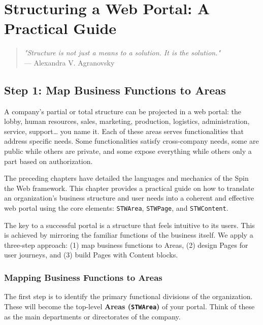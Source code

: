 \chapter{Structuring a Web Portal: A Practical Guide}
\label{chap:portal-structure}

\begin{quote}
\textit{"Structure is not just a means to a solution. It is the solution."} \\
— Alexandra V. Agranovsky
\end{quote}

\section{Step 1: Map Business Functions to Areas}
\label{sec:step1-areas}

A company's partial or total structure can be projected in a web portal: the lobby, human resources, sales, marketing, production, logistics, administration, service, support… you name it. Each of these areas serves functionalities that address specific needs. Some functionalities satisfy cross-company needs, some are public while others are private, and some expose everything while others only a part based on authorization.

The preceding chapters have detailed the languages and mechanics of the Spin the Web framework. This chapter provides a practical guide on how to translate an organization's business structure and user needs into a coherent and effective web portal using the core \wbdl{} elements: \texttt{STWArea}, \texttt{STWPage}, and \texttt{STWContent}.

The key to a successful portal is a structure that feels intuitive to its users. This is achieved by mirroring the familiar functions of the business itself. We apply a three-step approach: (1) map business functions to Areas, (2) design Pages for user journeys, and (3) build Pages with Content blocks.

\subsection{Mapping Business Functions to Areas}
The first step is to identify the primary functional divisions of the organization. These will become the top-level \textbf{Areas (\texttt{STWArea})} of your portal. Think of these as the main departments or directorates of the company.


